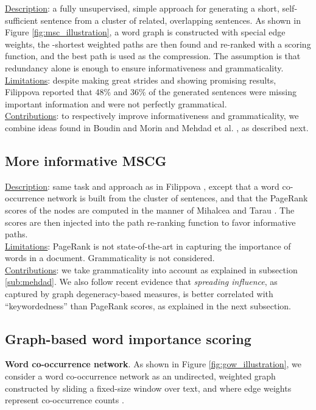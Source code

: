 \documentclass[11pt,a4paper]{article}
\begin{document}
\underline{Description}: a fully unsupervised, simple approach for generating a short, self-sufficient sentence from a cluster of related, overlapping sentences. As shown in Figure \ref{fig:msc_illustration}, a word graph is constructed with special edge weights, the -shortest weighted paths are then found and re-ranked with a scoring function, and the best path is used as the compression. The assumption is that redundancy alone is enough to ensure informativeness and grammaticality.\\
\underline{Limitations}: despite making great strides and showing promising results, Filippova  reported that 48\% and 36\% of the generated sentences were missing important information and were not perfectly grammatical.\\
\underline{Contributions}: to respectively improve informativeness and grammaticality, we combine ideas found in Boudin and Morin  and Mehdad et al. , as described next.

\subsection{More informative MSCG \cite{boudin2013keyphrase}}
\underline{Description}: same task and approach as in Filippova , except that a word co-occurrence network is built from the cluster of sentences, and that the PageRank scores of the nodes are computed in the manner of Mihalcea and Tarau . The scores are then injected into the path re-ranking function to favor informative paths.\\
\underline{Limitations}: PageRank is not state-of-the-art in capturing the importance of words in a document. Grammaticality is not considered. \\
\underline{Contributions}: we take grammaticality into account as explained in subsection \ref{sub:mehdad}. We also follow recent evidence \cite{tixier2016graph} that \textit{spreading influence}, as captured by graph degeneracy-based measures, is better correlated with ``keywordedness'' than PageRank scores, as explained in the next subsection.

\subsection{Graph-based word importance scoring \cite{tixier2016graph}}\label{app:a}
\noindent \textbf{Word co-occurrence network}. As shown in Figure \ref{fig:gow_illustration}, we consider a word co-occurrence network as an undirected, weighted graph constructed by sliding a fixed-size window over text, and where edge weights represent co-occurrence counts \cite{tixier2016gowvis,mihalcea2004textrank}.
\end{document}
